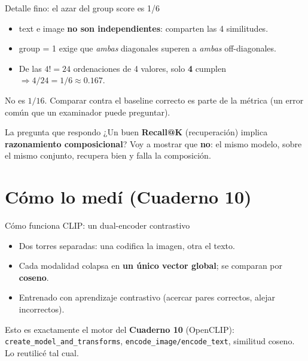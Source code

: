 \documentclass[aspectratio=169]{beamer}
\begin{document}
\begin{frame}{Detalle fino: el azar del group score es 1/6}
  \begin{itemize}
    \item text e image \textbf{no son independientes}: comparten las 4 similitudes.
    \item group = 1 exige que \emph{ambas} diagonales superen a \emph{ambas} off-diagonales.
    \item De las $4! = 24$ ordenaciones de 4 valores, solo \textbf{4} cumplen $\Rightarrow 4/24 = 1/6 \approx 0.167$.
  \end{itemize}
  \vfill
  \centering\alert{No es $1/16$.} Comparar contra el baseline correcto es parte de la métrica
  (un error común que un examinador puede preguntar).
\end{frame}

\begin{frame}{La pregunta que respondo}
  \Large
  \centering
  ¿Un buen \textbf{Recall@K} (recuperación) implica
  \textbf{razonamiento composicional}?
  \vfill
  \normalsize Voy a mostrar que \textbf{no}: el mismo modelo, sobre el mismo conjunto,
  recupera bien y \alert{falla la composición}.
\end{frame}

\section{Cómo lo medí (Cuaderno 10)}

\begin{frame}{Cómo funciona CLIP: un dual-encoder contrastivo}
  \begin{itemize}
    \item Dos torres separadas: una codifica la imagen, otra el texto.
    \item Cada modalidad colapsa en \textbf{un único vector global}; se comparan por \textbf{coseno}.
    \item Entrenado con aprendizaje contrastivo (acercar pares correctos, alejar incorrectos).
  \end{itemize}
  \vfill
  \footnotesize Esto es exactamente el motor del \textbf{Cuaderno 10} (OpenCLIP):
  \texttt{create\_model\_and\_transforms}, \texttt{encode\_image/encode\_text}, similitud coseno.
  Lo reutilicé tal cual.
\end{frame}
\end{document}
